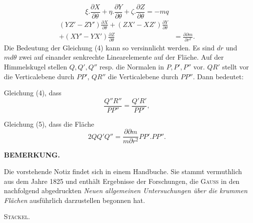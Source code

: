 %
\noindent [ist:]
\begin{equation}\tag{4}
\xi.\frac{\partial X}{\partial\theta}+\eta.\frac{\partial Y}{\partial\theta}+\zeta.\frac{\partial Z}{\partial\theta}=-mq
\end{equation}
\noindent [und]
\begin{equation}\tag{5}
\begin{aligned}
(YZ'-ZY')\frac{\partial X}{\partial\theta}+(ZX'-XZ')\frac{\partial Y}{\partial\theta}&\\
+(XY'-YX')\frac{\partial Z}{\partial\theta}&=\frac{\partial\partial m}{\partial r^2}.
\end{aligned}
\end{equation}
\indent Die Bedeutung der Gleichung (4) kann so versinnlicht werden. Es sind $dr$ und $md\theta$ zwei auf einander senkrechte Linearelemente auf der Fläche. Auf der Himmelskugel stellen $Q,Q',Q''$ resp. die Normalen in $P,P',P''$ vor. $QR'$ stellt vor die Verticalebene durch $PP'$, $QR''$ die Verticalebene durch $PP''$. Dann bedeutet:
\begin{center}\end{center}
\noindent\hspace*{1.2em}Gleichung (4), dass
\[
\frac{Q''R''}{PP''}=\frac{Q'R'}{PP'},
\]
\begin{center}\end{center}
\noindent\hspace*{1.2em}Gleichung (5), dass die Fläche
\[
2QQ'Q''=\frac{\partial\partial m}{m\partial r^2}PP'.PP''.
\]
\par{}\begin{center}\textbf{BEMERKUNG.}\end{center}
\noindent\hspace*{1.2em}Die vorstehende Notiz findet sich in einem Handbuche. Sie stammt vermuthlich aus dem Jahre 1825 und enthält Ergebnisse der Forschungen, die \textsc{Gauss} in den nachfolgend abgedruckten \textit{Neuen allgemeinen Untersuchungen über die krummen Flächen} ausführlich darzustellen begonnen hat.
\begin{flushright}\textsc{Stäckel}.\end{flushright}

